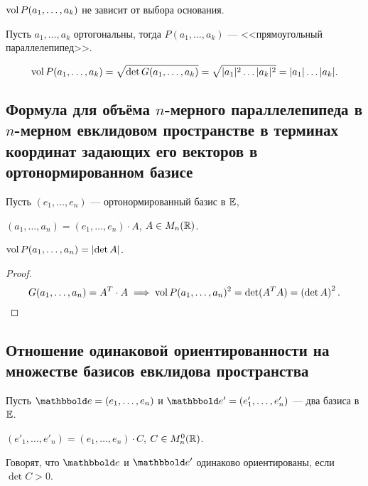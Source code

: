 \begin{corollary}
    $\operatorname{\mathop{\mathrm{vol}}} P(a_1, \dots, a_k)$ не зависит от выбора основания.
\end{corollary}

\begin{example}
    Пусть $a_1, \dots, a_k$ ортогональны, тогда $P(a_1, \dots, a_k)$ --- <<прямоугольный параллелепипед>>.

    \begin{equation*}
        \operatorname{\mathop{\mathrm{vol}}} P(a_1, \dots, a_k) = \sqrt{\det G(a_1, \dots, a_k)} = \sqrt{|a_1|^2 \dots |a_k|^2} = |a_1| \dots |a_k|
    .\end{equation*}
\end{example}


\subsection{Формула для объёма $n$-мерного параллелепипеда в $n$-мерном евклидовом пространстве в терминах координат задающих его векторов в ортонормированном базисе}

Пусть $(e_1, \dots, e_n)$ --- ортонормированный базис в $\mathbb{E}$,

$(a_1, \dots, a_n) = (e_1, \dots, e_n) \cdot A$, $A \in M_n(\mathbb{R})$.

\begin{proposal}
    $\operatorname{\mathop{\mathrm{vol}}} P(a_1, \dots, a_n) = \left|\det A\right|$.
\end{proposal}

\begin{proof}
    \begin{equation*}
        G(a_1, \dots, a_n) = A^{T} \cdot A \implies \operatorname{\mathop{\mathrm{vol}}} P(a_1, \dots, a_n)^2 = \det (A^{T} A) = \left(\det A\right)^2
    .\end{equation*}
\end{proof}


\subsection{Отношение одинаковой ориентированности на множестве базисов евклидова пространства}

Пусть $\E = (e_1, \dots, e_n)$ и $\E' = (e'_1, \dots, e'_n)$ --- два базиса в $\mathbb{E}$.

$(e'_1, \dots, e'_n) = (e_1, \dots, e_n) \cdot C$, $C \in M_n^0(\mathbb{R})$.

\begin{definition}
    Говорят, что $\E$ и $\E'$ одинаково ориентированы, если $\det C > 0$.
\end{definition}

